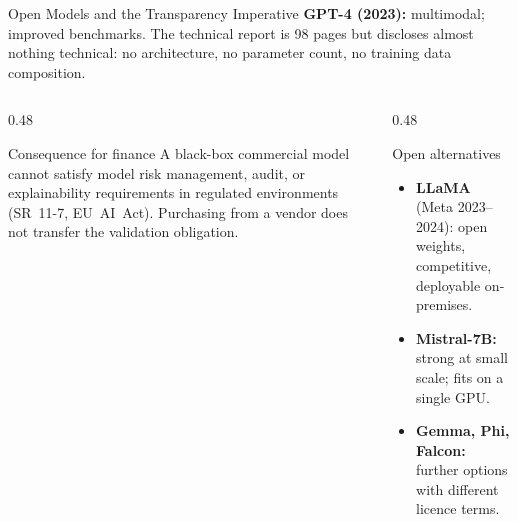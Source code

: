 \documentclass[11pt,aspectratio=169,professionalfonts]{beamer}
\begin{document}
%
%
\begin{frame}{Open Models and the Transparency Imperative}
  \textbf{GPT-4 (2023):} multimodal; improved benchmarks.
  The technical report is 98 pages but discloses almost nothing technical: no architecture, no parameter count, no training data composition.
\vspace{-.3cm}
  \begin{columns}[T]
    \begin{column}{0.48\linewidth}
      \begin{alertblock}{Consequence for finance}
        A black-box commercial model cannot satisfy model risk management,
        audit, or explainability requirements in regulated environments
        (SR~11-7, EU~AI~Act).
        Purchasing from a vendor does not transfer the validation obligation.
      \end{alertblock}
    \end{column}
    \begin{column}{0.48\linewidth}
      \begin{block}{Open alternatives}
        \begin{itemize}
          \item \textbf{LLaMA} (Meta 2023--2024): open weights,
                competitive, deployable on-premises.
          \item \textbf{Mistral-7B:} strong at small scale;
                fits on a single GPU.
          \item \textbf{Gemma, Phi, Falcon:} further options
                with different licence terms.
        \end{itemize}
      \end{block}
    \end{column}
  \end{columns}
\end{frame}
%
%
\end{document}
